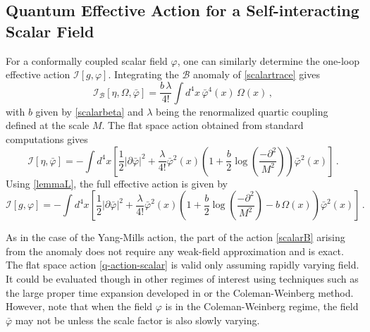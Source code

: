 \documentclass[12pt,a4paper]{article}
\newcommand{\be}{\begin{equation}}
\newcommand{\ee}{\end{equation}}
\newcommand{\cB}{\mathcal{B}}
\newcommand{\cI}{\mathcal{I}}
\renewcommand{\l}{\lambda}
\renewcommand{\O}{\Omega}
\newcommand{\1}{{\textbf{1}}}
\newcommand{\+}{{\,+ \,}}
\begin{document}
\subsection{Quantum  Effective Action for a Self-interacting Scalar Field\label{Scalar}}

For a conformally coupled scalar field $\varphi$, one can similarly determine the one-loop effective action $\cI[g, \varphi]$.  Integrating the $\cB$ anomaly of \eqref{scalartrace} gives
\be\label{scalarB}
\cI_{\cB}[\eta, \Omega, \bar \varphi] =  \frac{b\,\l}{4!} \int d^{4}x \,  \bar\varphi^{4}(x) \, \O (x) \, , 
\ee
with $b$ given by \eqref{scalarbeta} and $\lambda$ being the renormalized quartic coupling defined at the scale $M$. 
The flat space action obtained from standard computations gives
\be\label{q-action-scalar}
\cI[\eta, \bar\varphi] =  - \int d^{4}x  \left[  \frac{1 }{2} |\partial \bar\varphi |^{2}+ \frac{\l}{4!} \bar\varphi^{2}(x)  \left(1+ \frac{b}{2}\log \left(\frac{-\partial^{2}}{M^{2}}\right) \right)\bar\varphi^{2}(x) \right] \, .
\ee 
Using \eqref{lemmaL}, the full effective action is given by
 \be\label{q-action-scalar2}
\cI[g, \varphi] =  - \int d^{4}x  \left[  \frac{1 }{2} |\partial \bar\varphi |^{2}+ \frac{\l}{4!} \bar\varphi^{2}(x)  \left(1+ \frac{b}{2}\log \left(\frac{-\partial^{2}}{M^{2}}\right) - b\,\O(x) \right)\bar\varphi^{2}(x) \right] \, .
\ee 

As in the case of the Yang-Mills action,  the part of the action  \eqref{scalarB} arising from the anomaly  does not require any weak-field approximation and is exact. The flat space action \eqref{q-action-scalar} is valid only assuming rapidly varying field. It could be evaluated though in other regimes  of interest using techniques such as the large proper time expansion developed in \cite{Barvinsky:2002uf,Barvinsky:2003rx} or the Coleman-Weinberg method. However, note 
that when the field $\varphi$ is in the Coleman-Weinberg regime,  the field $\bar{\varphi}$ may not be unless the scale factor is also slowly varying.
 
\end{document}
